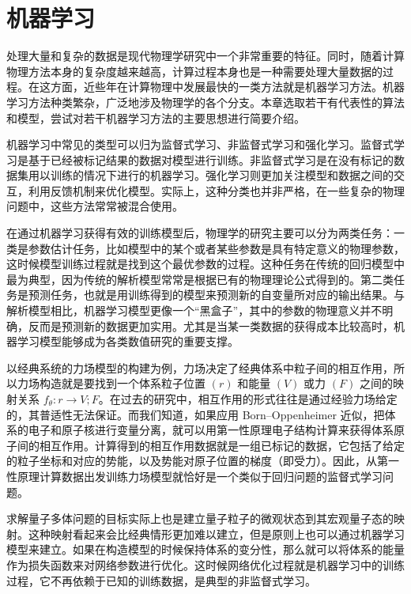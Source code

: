 \chapter{机器学习}

处理大量和复杂的数据是现代物理学研究中一个非常重要的特征。同时，随着计算物理方法本身的复杂度越来越高，计算过程本身也是一种需要处理大量数据的过程。在这方面，近些年在计算物理中发展最快的一类方法就是机器学习方法。机器学习方法种类繁杂，广泛地涉及物理学的各个分支。本章选取若干有代表性的算法和模型，尝试对若干机器学习方法的主要思想进行简要介绍。

机器学习中常见的类型可以归为监督式学习、非监督式学习和强化学习。监督式学习是基于已经被标记结果的数据对模型进行训练。非监督式学习是在没有标记的数据集用以训练的情况下进行的机器学习。强化学习则更加关注模型和数据之间的交互，利用反馈机制来优化模型。实际上，这种分类也并非严格，在一些复杂的物理问题中，这些方法常常被混合使用。

在通过机器学习获得有效的训练模型后，物理学的研究主要可以分为两类任务：一类是参数估计任务，比如模型中的某个或者某些参数是具有特定意义的物理参数，这时候模型训练过程就是找到这个最优参数的过程。这种任务在传统的回归模型中最为典型，因为传统的解析模型常常是根据已有的物理理论公式得到的。第二类任务是预测任务，也就是用训练得到的模型来预测新的自变量所对应的输出结果。与解析模型相比，机器学习模型更像一个“黑盒子”，其中的参数的物理意义并不明确，反而是预测新的数据更加实用。尤其是当某一类数据的获得成本比较高时，机器学习模型能够成为各类数值研究的重要支撑。

以经典系统的力场模型的构建为例，力场决定了经典体系中粒子间的相互作用，所以力场构造就是要找到一个体系粒子位置 $(r)$ 和能量 $(V)$ 或力 $(F)$ 之间的映射关系 $f_\theta:r\to V;F$。在过去的研究中，相互作用的形式往往是通过经验力场给定的，其普适性无法保证。而我们知道，如果应用 Born--Oppenheimer 近似，把体系的电子和原子核进行变量分离，就可以用第一性原理电子结构计算来获得体系原子间的相互作用。计算得到的相互作用数据就是一组已标记的数据，它包括了给定的粒子坐标和对应的势能，以及势能对原子位置的梯度（即受力）。因此，从第一性原理计算数据出发训练力场模型就恰好是一个类似于回归问题的监督式学习问题。

求解量子多体问题的目标实际上也是建立量子粒子的微观状态到其宏观量子态的映射。这种映射看起来会比经典情形更加难以建立，但是原则上也可以通过机器学习模型来建立。如果在构造模型的时候保持体系的变分性，那么就可以将体系的能量作为损失函数来对网络参数进行优化。这时候网络优化过程就是机器学习中的训练过程，它不再依赖于已知的训练数据，是典型的非监督式学习。


